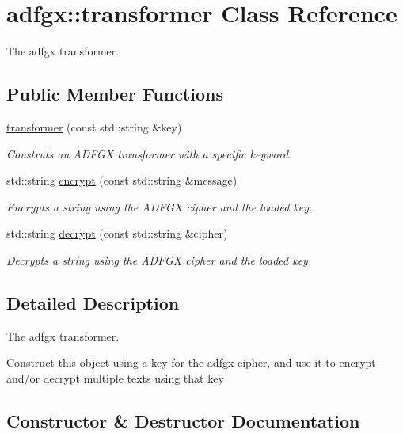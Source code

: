\hypertarget{classadfgx_1_1transformer}{}\section{adfgx\+:\+:transformer Class Reference}
\label{classadfgx_1_1transformer}


The adfgx transformer.  


\subsection*{Public Member Functions}
\begin{DoxyCompactItemize}
\item 
\hyperlink{classadfgx_1_1transformer_a22702dfde5ec9f3f07072fcf2397bafd}{transformer} (const std\+::string \&key)
\begin{DoxyCompactList}\small\item\em Construts an A\+D\+F\+GX transformer with a specific keyword. \end{DoxyCompactList}\item 
std\+::string \hyperlink{classadfgx_1_1transformer_a2ef992174d30380f21a333b2545b4913}{encrypt} (const std\+::string \&message)
\begin{DoxyCompactList}\small\item\em Encrypts a string using the A\+D\+F\+GX cipher and the loaded key. \end{DoxyCompactList}\item 
std\+::string \hyperlink{classadfgx_1_1transformer_a6fc1db3bf79b49f3d5c227149cc6acf5}{decrypt} (const std\+::string \&cipher)
\begin{DoxyCompactList}\small\item\em Decrypts a string using the A\+D\+F\+GX cipher and the loaded key. \end{DoxyCompactList}\end{DoxyCompactItemize}


\subsection{Detailed Description}
The adfgx transformer. 

Construct this object using a key for the adfgx cipher, and use it to encrypt and/or decrypt multiple texts using that key 

\subsection{Constructor \& Destructor Documentation}
